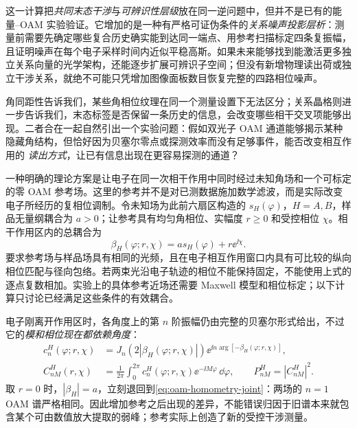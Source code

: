 这一计算把\emph{共同末态干涉}与\emph{可辨识性层级}放在同一逆问题中，但并不是已有的能量--OAM 实验验证。它增加的是一种有严格可证伪条件的\emph{关系噪声投影层析}：测量前需要先确定哪些复合历史确实能到达同一端点、用参考扫描标定四条复振幅，且证明噪声在每个电子采样时间内近似平稳高斯。如果未来能够找到能激活更多独立关系向量的光学架构，还能逐步扩展可辨识子空间；但没有新增物理读出荷或独立干涉关系，就绝不可能只凭增加图像面板数目恢复完整的四路相位噪声。


角同距性告诉我们，某些角相位纹理在同一个测量设置下无法区分；关系晶格则进一步告诉我们，末态标签是否保留一条历史的信息，会改变哪些相干交叉项能够出现。二者合在一起自然引出一个实验问题：假如双光子 OAM 通道能够揭示某种隐藏角结构，但恰好因为贝塞尔零点或探测效率而没有足够事件，能否改变相互作用的
\emph{读出方式}，让已有信息出现在更容易探测的通道？

一种明确的理论方案是让电子在同一次相干作用中同时经过未知角场和一个可标定的零 OAM 参考场。这里的参考并不是对已测数据施加数学滤波，而是实际改变电子所经历的复相位调制。令未知场为此前六扇区构造的 $s_H(\varphi)$，$H=A,B$，样品无量纲耦合为 $a>0$；让参考具有均匀角相位、实幅度 $r\ge0$ 和受控相位 $\chi$。相干作用区内的总耦合为
\begin{equation}
 \beta_H(\varphi;r,\chi)=a s_H(\varphi)+r\ee^{\ii\chi}.
 \label{eq:oam-coherent-reference-field}
\end{equation}
要求参考场与样品场具有相同的光频，且在电子相互作用窗口内具有可比较的纵向相位匹配与径向包络。若两束光沿电子轨迹的相位不能保持固定，不能使用上式的逐点复数相加。实验上的具体参考近场还需要 Maxwell 模型和相位标定；以下计算只讨论已经满足这些条件的有效耦合。

电子刚离开作用区时，各角度上的第 $n$ 阶振幅仍由完整的贝塞尔形式给出，不过它的\emph{模和相位现在都依赖角度}：
\begin{align}
 c_n^H(\varphi;r,\chi)
 &=J_n\!\left(2|\beta_H(\varphi;r,\chi)|\right)
 \ee^{\ii n\arg[-\beta_H(\varphi;r,\chi)]},\\
 C_{nM}^H(r,\chi)
 &=\frac1{2\pi}\int_0^{2\pi}
 c_n^H(\varphi;r,\chi)\ee^{-\ii M\varphi}\,\dd\varphi,
 \qquad P_{nM}^H=|C_{nM}^H|^2.
 \label{eq:oam-reference-nonlinear-fourier}
\end{align}
取 $r=0$ 时，$|\beta_H|=a$，立刻退回到\cref{eq:oam-homometry-joint}：两场的 $n=1$ OAM 谱严格相同。因此增加参考之后出现的差异，不能错误归因于旧谱本来就包含某个可由数值放大提取的弱峰；参考实际上创造了新的受控干涉测量。

